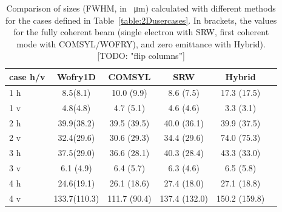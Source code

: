 \documentclass{iucr}              %
\newcommand{\todo}[1]{{\color{red}[TODO: "#1'']}}
\begin{document}






\newpage

\twocolumn


\begin{table}[]
    \label{table:comparison}
    \caption{Comparison of sizes (FWHM, in \SI{}{\micro\meter}) calculated with different methods for the cases defined in Table~\ref{table:2Dusercases}.
    In brackets, the values for the fully coherent beam (single electron with SRW, first coherent mode with COMSYL/WOFRY), and zero emittance with Hybrid). \todo{flip columns}
    }
    \centering
    \begin{tabular}{p{}|c|c|c|c|c}
         case h/v &
         Wofry1D&
         COMSYL&
         SRW&
         Hybrid \\
         \hline
1 h  & 8.5(8.1)    & 10.0 (9.9)  & 8.6 (7.5)   & 17.3 (17.5) \\
1 v  & 4.8(4.8)    & 4.7 (5.1)   & 4.6 (4.6)   & 3.3 (3.1) \\
\hline
2 h  & 39.9(38.2)  & 39.5 (39.5) & 40.0 (36.1)  & 39.9 (37.5) \\
2 v  & 32.4(29.6)  & 30.6 (29.3) & 34.4 (29.6)  & 74.0 (75.3) \\
\hline
3 h  & 37.5(29.0)  & 36.6 (28.1) & 40.3 (28.4)  & 43.3 (33.0) \\
3 v  & 6.1 (4.9)   & 6.4 (5.7)   & 6.3 (4.6)    & 6.5 (5.8) \\
\hline
4 h  & 24.6(19.1)  & 26.1 (18.6)  & 27.4 (18.0)   & 27.1 (18.8) \\
4 v  & 133.7(110.3)& 111.7 (90.4) & 137.4 (132.0) & 150.2 (159.8) \\
    \end{tabular}
\end{table}
\end{document}
